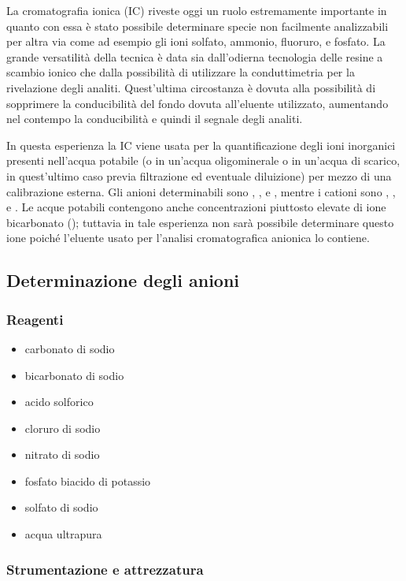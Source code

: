La cromatografia ionica (IC) riveste oggi un ruolo estremamente importante in quanto con essa è stato possibile determinare specie non facilmente analizzabili per altra via come ad esempio gli ioni solfato, ammonio, fluoruro, e fosfato. La grande versatilità della tecnica è data sia dall'odierna tecnologia delle resine a scambio ionico che dalla possibilità di utilizzare la conduttimetria per la rivelazione degli analiti. Quest'ultima circostanza è dovuta alla possibilità di sopprimere la conducibilità del fondo dovuta all'eluente utilizzato, aumentando nel contempo la conducibilità e quindi il segnale degli analiti.

In questa esperienza la IC viene usata per la quantificazione degli ioni inorganici presenti nell'acqua potabile (o in un'acqua oligominerale o in un'acqua di scarico, in quest'ultimo caso previa filtrazione ed eventuale diluizione) per mezzo di una calibrazione esterna. Gli anioni determinabili sono , ,  e , mentre i cationi sono , ,  e . Le acque potabili contengono anche concentrazioni piuttosto elevate di ione bicarbonato (); tuttavia in tale esperienza non sarà possibile determinare questo ione poiché l'eluente usato per l'analisi cromatografica anionica lo contiene.

\subsection{Determinazione degli anioni}

\subsubsection{Reagenti}

\begin{itemize}
\item carbonato di sodio
\item bicarbonato di sodio
\item acido solforico
\item cloruro di sodio
\item nitrato di sodio
\item fosfato biacido di potassio
\item solfato di sodio
\item acqua ultrapura
\end{itemize}

\subsubsection{Strumentazione e attrezzatura}

